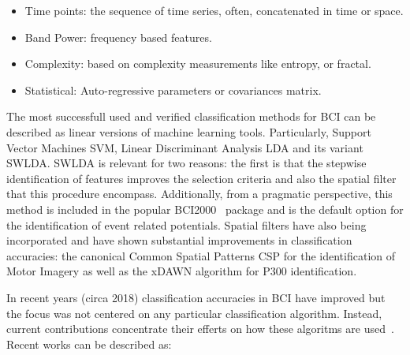 \begin{itemize}
\item Time points:  the sequence of time series, often, concatenated in time or space.
\item Band Power: frequency based features.
\item Complexity:  based on complexity measurements like entropy, or fractal.
\item Statistical: Auto-regressive parameters or covariances matrix.
\end{itemize}

The most successfull used and verified classification methods for BCI \cite{Lotte2007} can be described as linear versions of machine learning tools.  Particularly, Support Vector Machines SVM, Linear Discriminant Analysis LDA and its variant SWLDA.  SWLDA is relevant for two reasons:  the first is that the stepwise identification of features improves the selection criteria and also the spatial filter that this procedure encompass.  Additionally, from a pragmatic perspective, this method is included in the popular BCI2000~\cite{Schalk2004} package and is the default option for the identification of event related potentials.  Spatial filters have also being incorporated and have shown substantial improvements in classification accuracies: the canonical Common Spatial Patterns CSP for the identification of Motor Imagery as well as the xDAWN algorithm for P300 identification.

In recent years (circa 2018) classification accuracies in BCI have improved but the focus was not centered on any particular classification algorithm.  Instead, current contributions concentrate their efferts on how these algoritms are used~\cite{Lotte2018}.  Recent works can be described as:

